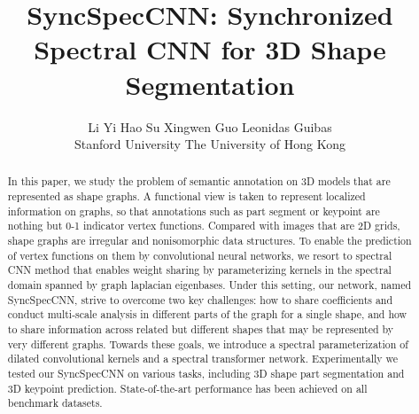\documentclass[10pt,twocolumn,letterpaper]{article}
\begin{document}
\title{SyncSpecCNN: Synchronized Spectral CNN for 3D Shape Segmentation}

\author{Li Yi \qquad Hao Su \qquad Xingwen Guo \qquad Leonidas Guibas\\Stanford University \qquad The University of Hong Kong}

\iffalse
\author{Li Yi\\
Stanford University\\
{\tt\small ericyi@stanford.edu}
\and
Hao Su\\
Stanford University\\
{\tt\small haosu@cs.stanford.edu}
\and
Xingwen Guo\\
The University of Hong Kong\\
{\tt\small emily.xw.guo@gmail.com}
\and
Leonidas Guibas\\
Stanford University\\
{\tt\small guibas@cs.stanford.edu}
}
\fi


\maketitle

\begin{abstract}
  In this paper, we study the problem of semantic annotation on 3D models that are represented as shape graphs.  A functional view is taken to represent localized information on graphs, so that annotations such as part segment or keypoint are nothing but 0-1 indicator vertex functions. Compared with images that are 2D grids, shape graphs are irregular and nonisomorphic data structures. To enable the prediction of vertex functions on them by convolutional neural networks, we resort to spectral CNN method that enables weight sharing by parameterizing kernels in the spectral domain spanned by graph laplacian eigenbases. Under this setting, our network, named SyncSpecCNN, strive to overcome two key challenges: how to share coefficients and conduct multi-scale analysis in different parts of the graph for a single shape, and how to share information across related but different shapes that may be represented by very different graphs. Towards these goals, we introduce a spectral parameterization of dilated convolutional kernels and a spectral transformer network. Experimentally we tested our SyncSpecCNN on various tasks, including 3D shape part segmentation and 3D keypoint prediction.  State-of-the-art performance has been achieved on all benchmark datasets.
 \end{abstract}
\end{document}
